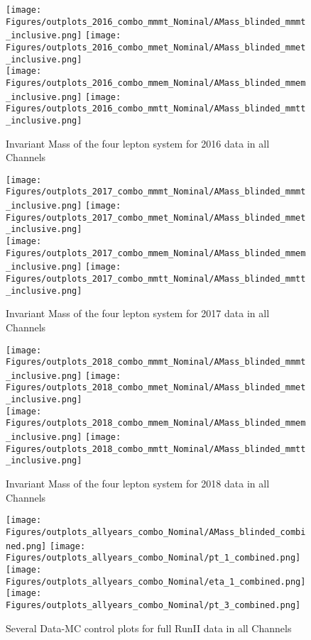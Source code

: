 \begin{figure}[ht!b]
  \centering
  \texttt{[image: Figures/outplots\_2016\_combo\_mmmt\_Nominal/AMass\_blinded\_mmmt\_inclusive.png]}
  \texttt{[image: Figures/outplots\_2016\_combo\_mmet\_Nominal/AMass\_blinded\_mmet\_inclusive.png]}\\
  \texttt{[image: Figures/outplots\_2016\_combo\_mmem\_Nominal/AMass\_blinded\_mmem\_inclusive.png]}
  \texttt{[image: Figures/outplots\_2016\_combo\_mmtt\_Nominal/AMass\_blinded\_mmtt\_inclusive.png]}\\
    \caption{\label{fig:AMass_2016_v1} Invariant Mass of the four lepton system for 2016 data in all Channels}
\end{figure}
\begin{figure}[ht!b]
  \centering
  \texttt{[image: Figures/outplots\_2017\_combo\_mmmt\_Nominal/AMass\_blinded\_mmmt\_inclusive.png]}
  \texttt{[image: Figures/outplots\_2017\_combo\_mmet\_Nominal/AMass\_blinded\_mmet\_inclusive.png]}\\
  \texttt{[image: Figures/outplots\_2017\_combo\_mmem\_Nominal/AMass\_blinded\_mmem\_inclusive.png]}
  \texttt{[image: Figures/outplots\_2017\_combo\_mmtt\_Nominal/AMass\_blinded\_mmtt\_inclusive.png]}\\
    \caption{\label{fig:AMass_2017_v1} Invariant Mass of the four lepton system for 2017 data in all Channels}
\end{figure}
\begin{figure}[ht!b]
  \centering
  \texttt{[image: Figures/outplots\_2018\_combo\_mmmt\_Nominal/AMass\_blinded\_mmmt\_inclusive.png]}
  \texttt{[image: Figures/outplots\_2018\_combo\_mmet\_Nominal/AMass\_blinded\_mmet\_inclusive.png]}\\
  \texttt{[image: Figures/outplots\_2018\_combo\_mmem\_Nominal/AMass\_blinded\_mmem\_inclusive.png]}
  \texttt{[image: Figures/outplots\_2018\_combo\_mmtt\_Nominal/AMass\_blinded\_mmtt\_inclusive.png]}\\
    \caption{\label{fig:AMass_2018_v1} Invariant Mass of the four lepton system for 2018 data in all Channels}
\end{figure}

\begin{figure}[ht!b]
  \centering
  \texttt{[image: Figures/outplots\_allyears\_combo\_Nominal/AMass\_blinded\_combined.png]}
  \texttt{[image: Figures/outplots\_allyears\_combo\_Nominal/pt\_1\_combined.png]}\\
  \texttt{[image: Figures/outplots\_allyears\_combo\_Nominal/eta\_1\_combined.png]}
  \texttt{[image: Figures/outplots\_allyears\_combo\_Nominal/pt\_3\_combined.png]}\\
    \caption{\label{fig:AMass_RunII}  Several Data-MC control plots for full RunII data in all Channels}
\end{figure}





